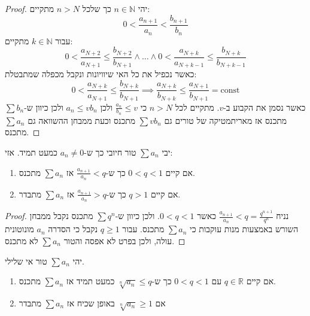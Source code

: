 \documentclass{tstextbook}
\begin{document}
\begin{proof}
יהי \(n \in \mathbb{N}\) כך שלכל \(n > N\) מתקיים:
$$0 < \frac{a_{n+1}}{a_{n}}<\frac{b_{n+1}}{b_{n}}$$
עבור \(k \in \mathbb{N}\) מתקיים:
$$0< \frac{a_{N+2}}{a_{N+1}}\leq \frac{b_{N+2}}{b_{N+1}}\land \dots \land 0< \frac{a_{N+k}}{a_{N+k-1}}\leq \frac{b_{N+k}}{b_{N+k-1}}$$
כאשר נכפיל את כל האי שיוויונות ונקבל מכפלה שמתבטלת:
$$0< \frac{a_{N+k}}{a_{N+1}}\leq \frac{b_{N+k}}{b_{N+1}}\implies \frac{a_{N+k}}{b_{N+k}}\leq \frac{a_{N+1}}{b_{N+1}}=\mathrm{const}$$
כאשר נסמן את הקבוע ב-\(v\). מתקיים לכל \(n>N\) כי \(\frac{a_{n}}{b_{n}}\leq v\) ולכן \(a_{n}\leq v b_{n}\) ולכן כיוון ש-\(\sum b_{n}\) מתכנס אז מאריתמטיקה של טורים גם \(\sum v b_{n}\) מתכנס וכעת ממבחן ההשוואה גם \(\sum a_{n}\) מתכנס.

\end{proof}
\begin{proposition}
יבי \(\sum a_{n}\) טור חיובי כך ש-\(a_{n}\neq 0\) כמעט תמיד. אזי:

  \begin{enumerate}
    \item אם קיים \(0<q<1\) כך ש-\(\frac{a_{n+1}}{a_{n}}<q\) אז \(\sum a_{n}\) מתכנס. 


    \item אם קיים \(q> 1\) כך ש-\(\frac{a_{n+1}}{a_{n}}>q\) אז \(\sum a_{n}\) מתבדר. 


  \end{enumerate}
\end{proposition}
\begin{proof}
נניח \(\frac{a_{n+1}}{a_{n}}<q=\frac{q^{n+1}}{q^{n}}\) כאשר \(0<q<1\). ולכן כיוון ש-\(\sum q^{n}\) מתכנס נקבל ממבחן השורש באמצעות מנות עוקבות כי \(\sum a_{n}\) מתכנס. עבור \(q\geq 1\) נקבל כי הסדרה \(a_{n}\) מונוטונית עולה, ולכן בפרט לא אפסה והטור \(\sum a_{n}\) לא מתכנס.

\end{proof}
\begin{proposition}
יהי \(\sum a_{n}\) טור אי שלילי.

  \begin{enumerate}
    \item אם קיים \(q \in \mathbb{R}\) עם \(0<q<1\) כך ש-\(\sqrt[n]{ a_{n} }\leq q\) כמעט תמיד אז \(\sum a_{n}\) מתכנס. 


    \item אם \(\sqrt[n]{ a_{n} }\geq 1\) באופן שכיח אז \(\sum a_{n}\) מתבדר 


  \end{enumerate}
\end{proposition}
\end{document}

